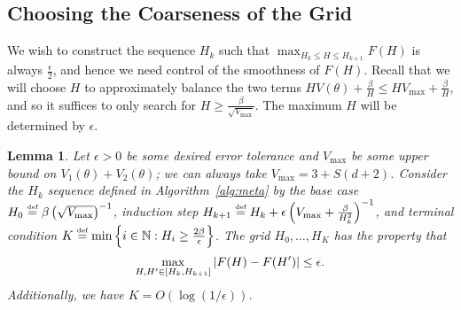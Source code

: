 \documentclass[11pt]{article}
\newtheorem{lemma}[theorem]{Lemma}
\newcommand{\df}{\stackrel{\mbox{\rm\tiny def}}{=}}
\begin{document}
\subsection{Choosing the Coarseness of the Grid}
We wish to construct the sequence $H_k$ such that $\max_{H_k\leq H\leq H_{k+1}} F(H)$ is always $\frac{\epsilon}{2}$, and hence we need control of the smoothness of $F(H)$. Recall that we will choose $H$ to approximately balance the two terms $H V(\theta) + \frac{\beta}{H} \leq H V_{\max} + \frac{\beta}{H}$, and so it suffices to only search for $H \geq \frac{\beta}{\sqrt{V_{\max}}}$. The maximum $H$ will be determined by $\epsilon$. 
\begin{lemma}
\label{lem:H_grid_bound}
Let $\epsilon>0$ be some desired error tolerance and $V_{\max}$ be some upper bound on $V_1(\theta) + V_2(\theta)$; we can always take $V_{\max}= 3 + S(d+2)$. Consider the $H_k$ sequence defined in Algorithm~\ref{alg:meta} by the base case $H_0 \df  \beta\left(\sqrt{V_{\max}}\right)^{-1}$, induction step
$H_{k+1} \df H_k + \epsilon \left( V_{\max} +\frac{\beta }{H_k^2} \right)^{-1}$, and terminal condition
$ K \df \min\left\{i\in\nat : H_i \geq \frac{2\beta}{\epsilon}\right\}$.
The grid $H_0,\ldots, H_K$ has the property that 
\begin{equation}
  \max_{H,H' \in [H_k, H_{k+1}]} \left\vert F(H) - F(H')\right\vert\leq \epsilon.
\end{equation}
Additionally, we have $K = O(\log( 1/\epsilon))$.
\end{lemma}
\end{document}

